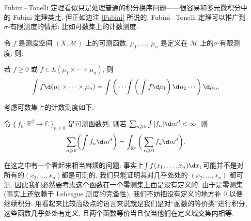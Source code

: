 \begin{alterendnote}
    Fubini\,--\,Tonelli 定理看似只是处理普通的积分换序问题------很容易和多元微积分中的 Fubini 定理类比, 但正如边注 \ref{Fubini} 所说的, Fubini\,--\,Tonelli 定理可以推广到\;$\sigma $-有限测度的情形: 比如可数集上的计数测度.
    \begin{theorem}
        令 $f$ 是测度空间 $(X,\mathcal M)$ 上的可测函数, $\mu _1$, $\dots $, $\mu _n$ 是定义在 $\mathcal M$ 上的\;$\sigma $-有限测度, 则:

        若 $f\geqslant 0$ 或 $f\in L(\mu_1 \times \cdots \times \mu _n)$, 则
        \[
            \int f \d (\mu_1\times \cdots \times \mu _n) = \int\left(\,\cdots \!\int\left(\, \int f \d \mu_1 \right) \d \mu_2\cdots \right)\d \mu_n
            .\]
    \end{theorem}
    考虑可数集上的计数测度如下:
    \begin{theorem}
        令 $\{\,f_n: \mathbb R^d\to \mathbb C\,\}_{n\geqslant 0}$ 是可测函数列, 则若 $\sum_{n\geqslant 0}\int |f_n|\d m^d<\infty$, 则
        \[
            \sum_{n\geqslant 0}\biggl(\int f_n\d m^d\biggr) = \int_{\mathbb R^n}\biggl(\,\sum_{n\geqslant 0} f_n\d m^d\biggr)
            .\]
    \end{theorem}
\end{alterendnote}
\begin{alterendnote}
    在这之中有一个看起来相当麻烦的问题: 事实上$\int f(x_1,\dots,x_n)\d x_1$可能并不是对所有的$(x_2,\dots,x_n)$都是可测的, 我们只能证明其对几乎处处的 $(x_2,\dots,x_n)$ 都可测, 因此我们必然要考虑这个函数在一个零测集上面是没有定义的. 由于是零测集(事实上还依赖于 Lebesgue 测度的完备性), 我们不妨把没有定义的地方补 $0$ 以便继续积分. 用看起来比较高级点的语言来说就是我们是对``函数的等价类''进行积分, 这些函数几乎处处有定义, 且两个函数等价当且仅当他们在定义域交集内相等.
\end{alterendnote}

